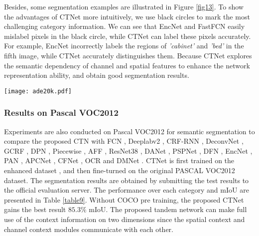 \documentclass[10pt,journal,cspaper,compsoc]{IEEEtran}
\begin{document}
Besides, some segmentation examples are illustrated in Figure \ref{fig13}. To show the advantages of CTNet more intuitively, we use black circles to mark the most challenging category information. We can see that EncNet and FastFCN easily mislabel pixels in the black circle, while CTNet can label these pixels accurately. For example, EncNet incorrectly labels the regions of \textit{'cabinet'} and \textit{'bed'} in the fifth image, while CTNet accurately distinguishes them. Because CTNet explores the semantic dependency of channel and spatial features to enhance the network representation ability, and obtain good segmentation results.
\begin{figure*}
	\centering
	\texttt{[image: ade20k.pdf]}
		\caption{Visualization results of EncNet, FastFCN, and CTNet on ADE20K. (a) input image, (b) GT, (c) CTNet, (d) EncNet, and (e) FastFCN.}
	\label{fig13}
\vspace{-4mm}
\end{figure*}
	
	
\subsubsection{Results on Pascal VOC2012}
Experiments are also conducted on Pascal VOC2012 for semantic segmentation to compare the proposed CTN with FCN \cite{shelhamer2017fully}, Deeplabv2 \cite{chen2017deeplab}, CRF-RNN \cite{zheng2015conditional}, DeconvNet \cite{noh2015learning}, GCRF \cite{vemulapalli2016gaussian}, DPN \cite{liu2015semantic}, Piecewise \cite{lin2016efficient}, AFF \cite{ke2018adaptive}, ResNet38 \cite{wu2019wider}, DANet \cite{fu2019dual}, PSPNet \cite{zhao2017pyramid}, DFN \cite{yu2018learning}, EncNet \cite{zhang2018context}, PAN \cite{li2018pyramid}, APCNet \cite{he2019adaptive}, CFNet \cite{zhang2019co}, OCR \cite{yuan2020object} and DMNet \cite{he2019dynamic}. CTNet is first trained on the enhanced dataset \cite{hariharan2015hypercolumns}, and then fine-turned on the original PASCAL VOC2012 dataset. The segmentation results are obtained by submitting the test results to the official evaluation server. The performance over each category and mIoU are presented in Table \ref{table9}. Without COCO pre training, the proposed CTNet gains the best result $85.3\%$ mIoU. The proposed tandem network can make full use of the context information on two dimensions since the spatial context and channel context modules communicate with each other. 
\end{document}

